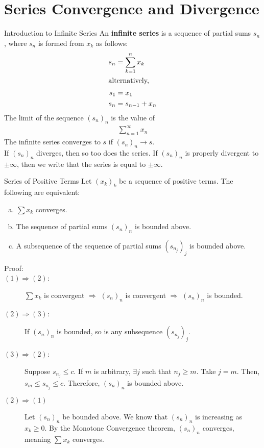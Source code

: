 \documentclass[10pt]{extarticle}
\begin{document}
  \section*{Series Convergence and Divergence}%
  \begin{problem}{Introduction to Infinite Series}
    An \textbf{infinite series} is a sequence of partial sums $s_n$, where $s_n$ is formed from $x_k$ as follows:
    \begin{align*}
      s_n &= \sum_{k=1}^{n} x_k\\
      \shortintertext{alternatively,}
      s_1 &= x_1\\
      s_{n} &= s_{n-1} + x_n
    \end{align*}
    The limit of the sequence $(s_n)_n$ is the value of
    \begin{align*}
      \sum_{n=1}^{\infty}x_n
    \end{align*}
    The infinite series converges to $s$ if $(s_n)_n \rightarrow s$.\\

    If $(s_n)_n$ diverges, then so too does the series. If $(s_n)_n$ is properly divergent to $\pm \infty$, then we write that the series is equal to $\pm\infty$.
  \end{problem}
  \begin{problem}{Series of Positive Terms}
    Let $(x_k)_k$ be a sequence of positive terms. The following are equivalent:
    \begin{enumerate}[(a)]
      \item $\sum x_k$ converges.
      \item The sequence of partial sums $(s_n)_n$ is bounded above.
      \item A subsequence of the sequence of partial sums $(s_{n_j})_j$ is bounded above.
    \end{enumerate}
    \begin{description}
      \item[Proof:] \hfill
      \item[$(1) \Rightarrow (2)$:] $\sum x_k$ is convergent $\Rightarrow$ $(s_n)_n$ is convergent $\Rightarrow$ $(s_n)_n$ is bounded.
      \item[$(2) \Rightarrow (3)$:] If $(s_n)_n$ is bounded, so is any subsequence $(s_{n_j})_j$.
      \item[$(3) \Rightarrow (2)$:] Suppose $s_{n_j} \leq c$. If $m$ is arbitrary, $\exists j$ such that $n_j \geq m$. Take $j = m$. Then, $s_{m} \leq s_{n_j} \leq c$. Therefore, $(s_n)_n$ is bounded above.
      \item[$(2) \Rightarrow (1)$] Let $(s_n)_n$ be bounded above. We know that $(s_n)_n$ is increasing as $x_k \geq 0$. By the Monotone Convergence theorem, $(s_n)_n$ converges, meaning $\sum x_k$ converges.
    \end{description}
  \end{problem}
\end{document}
